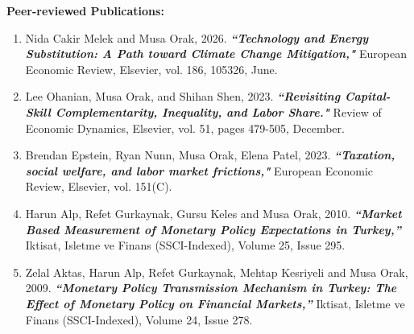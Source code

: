 \documentclass[10pt]{article}
\begin{document}
\textbf{Peer-reviewed Publications:}  \smallskip
\begin{enumerate}
\item Nida Cakir Melek and Musa Orak, 2026. \textit{\textbf{``Technology and Energy Substitution: A Path toward Climate Change Mitigation,"}} European Economic Review, Elsevier, vol. 186, 105326, June.

\item Lee Ohanian, Musa Orak, and Shihan Shen, 2023. \textit{\textbf{``Revisiting Capital-Skill Complementarity, Inequality, and Labor Share."}} Review of Economic Dynamics, Elsevier, vol. 51, pages 479-505, December.

\item Brendan Epstein, Ryan Nunn, Musa Orak, Elena Patel, 2023. \textit{\textbf{``Taxation, social welfare, and labor market frictions,"}} European Economic Review, Elsevier, vol. 151(C).

\item Harun Alp, Refet Gurkaynak, Gursu Keles and Musa Orak, 2010. \textit{\textbf{``Market Based Measurement of Monetary Policy Expectations in Turkey,''}} Iktisat, Isletme ve Finans (SSCI-Indexed), Volume 25, Issue 295.\medskip


\item Zelal Aktas, Harun Alp, Refet Gurkaynak, Mehtap Kesriyeli and Musa Orak, 2009. \textit{\textbf{``Monetary Policy Transmission Mechanism in Turkey: The Effect of Monetary Policy on Financial Markets,''}} Iktisat, Isletme ve Finans (SSCI-Indexed), Volume 24, Issue 278. \medskip
\end{enumerate}
\end{document}
